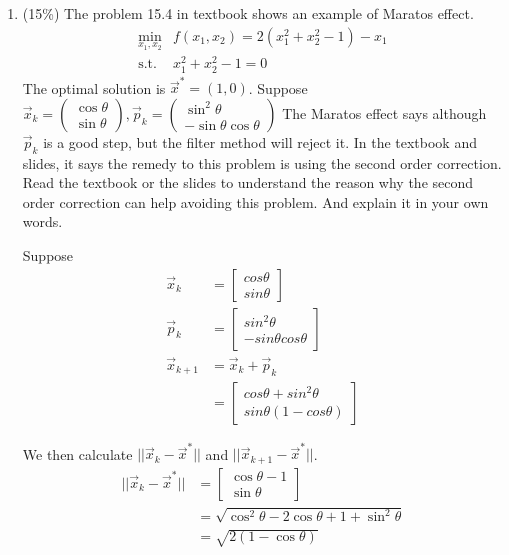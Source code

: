 \documentclass[a4paper,10pt]{article}
\begin{document}
\begin{enumerate}
{In fact, the smallest possible condition number is $1$, where an error is neither magnified nor diminished.
}

\item (15\%) The problem 15.4 in textbook shows an example of Maratos effect.
		\begin{align*}
		\min_{x_1, x_2} & f( x_1, x_2 ) = 2( x_1^2 + x_2^2 -1) -x_1\\
		\mbox{s.t. } & x_1^2 + x_2^2 -1=0
		\end{align*}
	The optimal solution is $\vec{x}^* = (1,0)$. Suppose 
	$\vec{x}_k =
		\left(
		\begin{array}{l}
			\cos \theta\\
			\sin \theta
		\end{array} \right),
		\vec{p}_k =
		\left(\begin{array}{c}
			\sin^2 \theta\\
			- \sin \theta \cos \theta
		\end{array} \right)$
	The Maratos effect says although $\vec{p}_k$ is a good step, but the filter method will reject it. In the textbook and slides, 
	it says the remedy to this problem is using the second order correction. Read the textbook or the slides to understand the reason why the second order correction can help avoiding this problem. And explain it in your own words. 
    
    {\color{blue}
        Suppose 
        \begin{align}
            \vec{x}_k &= \begin{bmatrix} cos \theta \\ sin \theta \end{bmatrix} \\
            \vec{p}_k &= \begin{bmatrix} sin^2 \theta \\ - sin \theta cos \theta \end{bmatrix}\\
            \vec{x}_{k+1} &= \vec{x}_k + \vec{p}_k \\
            &= \begin{bmatrix} cos \theta + sin^2 \theta \\ sin \theta (1 - cos \theta) \end{bmatrix}
        \end{align}

        We then calculate $||\vec{x}_k - \vec{x}^*||$ and $||\vec{x}_{k+1} - \vec{x}^*||$.
        \begin{align}
            ||\vec{x}_k - \vec{x}^*|| &= \begin{bmatrix} \cos \theta-1 \\ \sin \theta \end{bmatrix} \\
            &=\sqrt{\cos^{2} \theta-2\cos\theta+ 1 +\sin^{2} \theta} \\
            &=\sqrt{2(1-\cos\theta)}
        \end{align}

}
\end{enumerate}
\end{document}
